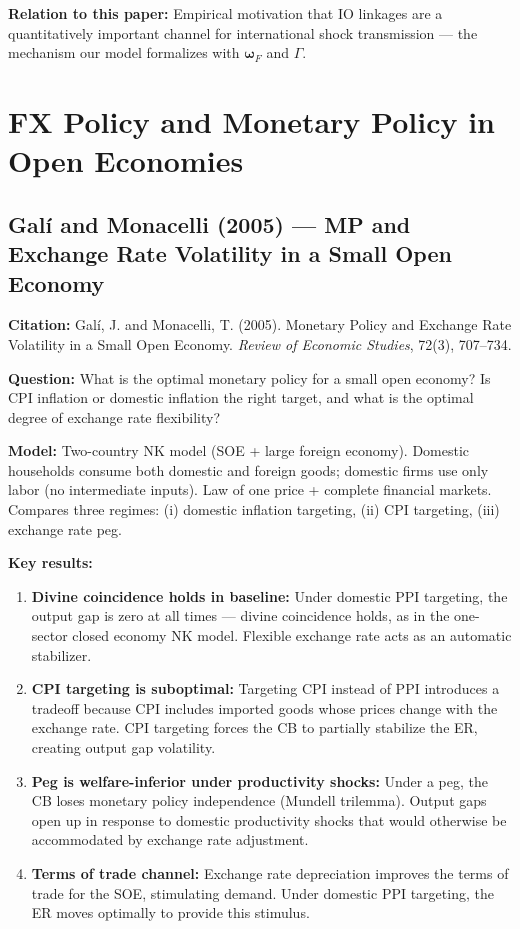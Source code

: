 \documentclass[12pt]{article}
\begin{document}
\textbf{Relation to this paper:} Empirical motivation that IO linkages are a quantitatively important channel for international shock transmission --- the mechanism our model formalizes with $\bm{\omega}_F$ and $\Gamma$.

\section{FX Policy and Monetary Policy in Open Economies}

\subsection{Galí and Monacelli (2005) --- MP and Exchange Rate Volatility in a Small Open Economy}

\textbf{Citation:} Galí, J. and Monacelli, T. (2005). Monetary Policy and Exchange Rate Volatility in a Small Open Economy. \textit{Review of Economic Studies}, 72(3), 707--734.

\textbf{Question:} What is the optimal monetary policy for a small open economy? Is CPI inflation or domestic inflation the right target, and what is the optimal degree of exchange rate flexibility?

\textbf{Model:} Two-country NK model (SOE + large foreign economy). Domestic households consume both domestic and foreign goods; domestic firms use only labor (no intermediate inputs). Law of one price + complete financial markets. Compares three regimes: (i) domestic inflation targeting, (ii) CPI targeting, (iii) exchange rate peg.

\textbf{Key results:}
\begin{enumerate}
    \item \textbf{Divine coincidence holds in baseline:} Under domestic PPI targeting, the output gap is zero at all times --- divine coincidence holds, as in the one-sector closed economy NK model. Flexible exchange rate acts as an automatic stabilizer.
    \item \textbf{CPI targeting is suboptimal:} Targeting CPI instead of PPI introduces a tradeoff because CPI includes imported goods whose prices change with the exchange rate. CPI targeting forces the CB to partially stabilize the ER, creating output gap volatility.
    \item \textbf{Peg is welfare-inferior under productivity shocks:} Under a peg, the CB loses monetary policy independence (Mundell trilemma). Output gaps open up in response to domestic productivity shocks that would otherwise be accommodated by exchange rate adjustment.
    \item \textbf{Terms of trade channel:} Exchange rate depreciation improves the terms of trade for the SOE, stimulating demand. Under domestic PPI targeting, the ER moves optimally to provide this stimulus.
\end{enumerate}
\end{document}
